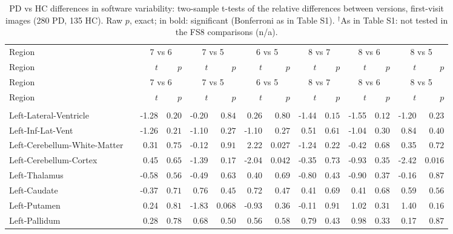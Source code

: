 {\scriptsize\setlength{\tabcolsep}{3pt}
\begin{longtable}{llrrrrrrrrrrrr}
\caption{PD vs HC differences in software variability: two-sample t-tests of the relative differences between versions, first-visit images (280 PD, 135 HC). Raw $p$, exact; in bold: significant (Bonferroni as in Table S1). $^{\dagger}$As in Table S1: not tested in the FS8 comparisons (n/a).}\label{tab:S4}\\
\toprule
Region & & \multicolumn{2}{c}{7 vs 6} & \multicolumn{2}{c}{7 vs 5} & \multicolumn{2}{c}{6 vs 5} & \multicolumn{2}{c}{8 vs 7} & \multicolumn{2}{c}{8 vs 6} & \multicolumn{2}{c}{8 vs 5} \\
Region & & $t$ & $p$ & $t$ & $p$ & $t$ & $p$ & $t$ & $p$ & $t$ & $p$ & $t$ & $p$ \\
\midrule\endfirsthead
\toprule
Region & & \multicolumn{2}{c}{7 vs 6} & \multicolumn{2}{c}{7 vs 5} & \multicolumn{2}{c}{6 vs 5} & \multicolumn{2}{c}{8 vs 7} & \multicolumn{2}{c}{8 vs 6} & \multicolumn{2}{c}{8 vs 5} \\
Region & & $t$ & $p$ & $t$ & $p$ & $t$ & $p$ & $t$ & $p$ & $t$ & $p$ & $t$ & $p$ \\
\midrule\endhead
\bottomrule\endfoot
\midrule\multicolumn{14}{l}{\textbf{Volume (subcortical)}} \\
Left-Lateral-Ventricle &  & -1.28 & $0.20$ & -0.20 & $0.84$ & 0.26 & $0.80$ & -1.44 & $0.15$ & -1.55 & $0.12$ & -1.20 & $0.23$ \\
Left-Inf-Lat-Vent &  & -1.26 & $0.21$ & -1.10 & $0.27$ & -1.10 & $0.27$ & 0.51 & $0.61$ & -1.04 & $0.30$ & 0.84 & $0.40$ \\
Left-Cerebellum-White-Matter &  & 0.31 & $0.75$ & -0.12 & $0.91$ & 2.22 & $0.027$ & -1.24 & $0.22$ & -0.42 & $0.68$ & 0.35 & $0.72$ \\
Left-Cerebellum-Cortex &  & 0.45 & $0.65$ & -1.39 & $0.17$ & -2.04 & $0.042$ & -0.35 & $0.73$ & -0.93 & $0.35$ & -2.42 & $0.016$ \\
Left-Thalamus &  & -0.58 & $0.56$ & -0.49 & $0.63$ & 0.40 & $0.69$ & -0.80 & $0.43$ & -0.90 & $0.37$ & -0.16 & $0.87$ \\
Left-Caudate &  & -0.37 & $0.71$ & 0.76 & $0.45$ & 0.72 & $0.47$ & 0.41 & $0.69$ & 0.41 & $0.68$ & 0.59 & $0.56$ \\
Left-Putamen &  & 0.24 & $0.81$ & -1.83 & $0.068$ & -0.93 & $0.36$ & -0.11 & $0.91$ & 1.02 & $0.31$ & 1.40 & $0.16$ \\
Left-Pallidum &  & 0.28 & $0.78$ & 0.68 & $0.50$ & 0.56 & $0.58$ & 0.79 & $0.43$ & 0.98 & $0.33$ & 0.17 & $0.87$ \\

\end{longtable}}
